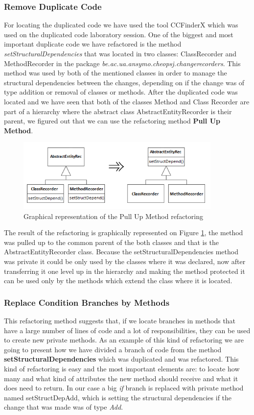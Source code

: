 \documentclass[a4paper]{article}
\begin{document}
\subsubsection{Remove Duplicate Code}
For locating the duplicated code we have used the tool CCFinderX which was used on the duplicated code laboratory session. One of the biggest and most important duplicate code we have refactored is the method \emph{setStructuralDependencies} that was located in two classes: ClassRecorder and MethodRecorder in the package \emph{be.ac.ua.ansymo.cheopsj.changerecorders}. This method was used by both of the mentioned classes in order to manage the structural dependencies between the changes, depending on if the change was of type addition or removal of classes or methods.
After the duplicated code was located and we have seen that both of the classes Method and Class Recorder are part of a hierarchy where the abstract class AbstractEntityRecorder is their parent, we figured out that we can use the refactoring method \textbf{Pull Up Method}.

\begin{figure}[h]
\centering
\includegraphics[width=0.9\textwidth]{Images/PullUpMethod}
\caption{Graphical representation of the Pull Up Method refactoring}
\label{fig:PullUp}
\end{figure}

The result of the refactoring is graphically represented on Figure \ref{fig:PullUp}, the method was pulled up to the common parent of the both classes and that is the AbstractEntityRecorder class. Because the setStructuralDependencies method was private it could be only used by the classes where it was declared, now after transferring it one level up in the hierarchy and making the method protected it can be used only by the methods which extend the class where it is located.

\subsubsection{Replace Condition Branches by Methods}
This refactoring method suggests that, if we locate branches in methods that have a large number of lines of code and a lot of responsibilities, they can be used to create new private methods. As an example of this kind of refactoring we are going to present how we have divided a branch of code from the method \textbf{setStructuralDependencies} which was duplicated and was refactored. This kind of refactoring is easy and the most important elements are: to locate how many and what kind of attributes the new method should receive and what it does need to return. In our case a big \emph{if} branch is replaced with private method named setStructDepAdd, which is setting the structural dependencies if the change that was made was of type \emph{Add}.
\end{document}
